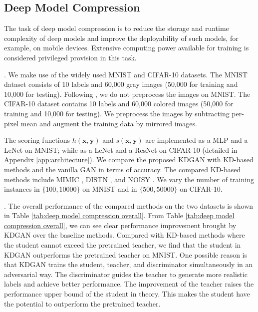 \documentclass{article}
\newcommand{\OVEC}[1]{\bm{#1}} %
\newcommand{\stdscore}{h(\OVEC{x},\OVEC{y})}
\newcommand{\priscore}{s(\OVEC{x},\OVEC{y})}
\begin{document}
\subsection{Deep Model Compression} \label{sec:deep model compression}

The task of deep model compression is to reduce the storage and runtime complexity of deep models and improve the deployability of such models, for example, on mobile devices.
Extensive computing power available for training is considered privileged provision in this task.

.
We make use of the widely used MNIST \cite{lecun1998gradient} and CIFAR-10 \cite{krizhevsky2009learning} datasets.
The MNIST dataset consists of 10 labels and 60,000 gray images (50,000 for training and 10,000 for testing).
Following \cite{sau2016deep}, we do not preprocess the images on MNIST.
The CIFAR-10 dataset contains 10 labels and 60,000 colored images (50,000 for training and 10,000 for testing).
We preprocess the images by subtracting per-pixel mean and augment the training data by mirrored images.

The scoring functions $\stdscore$ and $\priscore$ are implemented as a MLP \cite{lecun1998gradient} and a LeNet \cite{lecun1998gradient} on MNIST; while as a LeNet \cite{lecun1998gradient} and a ResNet \cite{he2016deep} on CIFAR-10 (detailed in Appendix \ref{app:architecture}).
We compare the proposed KDGAN with KD-based methods and the vanilla GAN in terms of accuracy.
The compared KD-based methods include MIMIC \cite{ba2014deep}, DISTN \cite{hinton2015distilling}, and NOISY \cite{sau2016deep}.
We vary the number of training instances in $\{100,10000\}$ on MNIST and in $\{500,50000\}$ on CIFAR-10.

.
The overall performance of the compared methods on the two datasets is shown in Table \ref{tab:deep model compression overall}.
From Table \ref{tab:deep model compression overall}, we can see clear performance improvement brought by KDGAN over the baseline methods.
Compared with KD-based methods where the student cannot exceed the pretrained teacher, we find that the student in KDGAN outperforms the pretrained teacher on MNIST.
One possible reason is that KDGAN trains the student, teacher, and discriminator simultaneously in an adversarial way.
The discriminator guides the teacher to generate more realistic labels and achieve better performance.
The improvement of the teacher raises the performance upper bound of the student in theory.
This makes the student have the potential to outperform the pretrained teacher.
\end{document}
